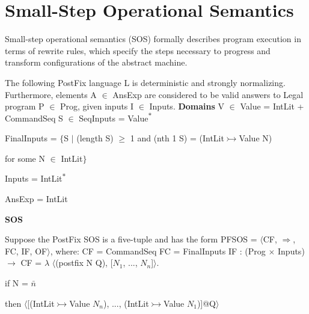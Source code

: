\documentclass[a4paper,11pt]{article}
\begin{document}
\section{Small-Step Operational Semantics}
\begin{par} Small-step operational semantics (SOS) formally describes program execution in terms of rewrite rules, which specify the steps necessary to progress and transform configurations of the abstract machine. \end{par}
\begin{par}The following PostFix language L is deterministic and strongly normalizing. Furthermore, elements A $\in$ AnsExp are considered to be valid answers to Legal program P $\in$ Prog, given inputs I $\in$ Inputs. \vspace{5mm} \newline
\textbf{Domains} \newline
V $\in$ Value = IntLit + CommandSeq \newline
S $\in$ SeqInputs = Value\textsuperscript{$\ast$} \end{par}
\begin{par} FinalInputs = $\{$S $\mid$ (length S) $\geq$ 1 and (nth 1 S) = (IntLit$\rightarrowtail$Value N) \end{par} \begin{par} for some N $\in$ IntLit$\}$ \end{par}
\begin{par} Inputs = IntLit\textsuperscript{$\ast$} \end{par}
\begin{par} AnsExp = IntLit \end{par}
\vspace{5mm} \newline
\textbf{SOS}
\begin{par} Suppose the PostFix SOS is a five-tuple and has the form PFSOS = $\langle$CF, $\Rightarrow$, FC, IF, OF$\rangle$, where: \vspace{5mm} \newline
CF = CommandSeq \newline
FC = FinalInputs \newline
IF : (Prog $\times$ Inputs) $\rightarrow$ CF \newline
= $\lambda$ $\langle$(postfix N Q), [$N_1$, ..., $N_n$]$\rangle$. \end{par}
\begin{par} if N = $\bar{n}$ \end{par}
\begin{par} then $\langle$[(IntLit$\rightarrowtail$Value $N_n$), ..., (IntLit$\rightarrowtail$Value $N_1$)]@Q$\rangle$ \end{par}
\end{document}
